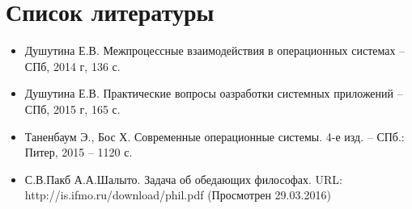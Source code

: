 \documentclass[a4paper]{article}
\begin{document}
\section{Список литературы}
\begin{itemize}
\item Душутина Е.В.  Межпроцессные взаимодействия в операционных системах – СПб, 2014 г, 136 с.
\item Душутина Е.В.  Практические вопросы оазработки системных приложений – СПб, 2015 г, 165 с.
\item Таненбаум Э., Бос Х. Современные операционные системы. 4-е изд. – СПб.: Питер, 2015 – 1120 с.
\item С.В.Пакб А.А.Шалыто. Задача об обедающих философах. URL: http://is.ifmo.ru/download/phil.pdf (Просмотрен 29.03.2016)
\end{itemize}
	
	
\end{document}
